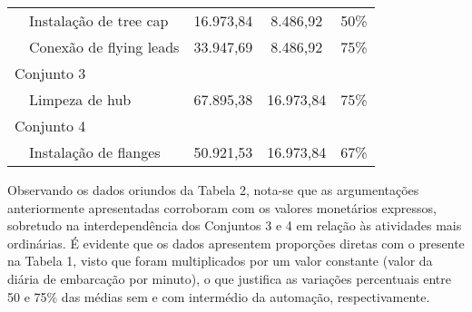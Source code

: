 \begin{table}[h!]
{\begin{tabular}{llccc}
			& Instalação de tree cap                 & 16.973,84                                                                              & 8.486,92                                                                             & 50\%                                                          \\
			& Conexão de flying leads                & 33.947,69                                                                              & 8.486,92                                                                             & 75\%                                                          \\
			\multicolumn{2}{l}{Conjunto 3}                  &                                                                                        &                                                                                      &                                                               \\
			& Limpeza de hub                         & 67.895,38                                                                              & 16.973,84                                                                            & 75\%                                                          \\
			\multicolumn{2}{l}{Conjunto 4}                  &                                                                                        &                                                                                      &                                                               \\
			& Instalação de flanges                  & 50.921,53                                                                              & 16.973,84                                                                            & 67\%                                                          \\ \hline
		\end{tabular}%
	}
\end{table}
Observando os dados oriundos da Tabela 2, nota-se que as argumentações anteriormente apresentadas corroboram com os valores monetários expressos, sobretudo na interdependência dos Conjuntos 3 e 4 em relação às atividades mais ordinárias. É evidente que os dados apresentem proporções diretas com o presente na Tabela 1, visto que foram multiplicados por um valor constante (valor da diária de embarcação por minuto), o que justifica as variações percentuais entre 50 e 75\% das médias sem e com intermédio da automação, respectivamente.

